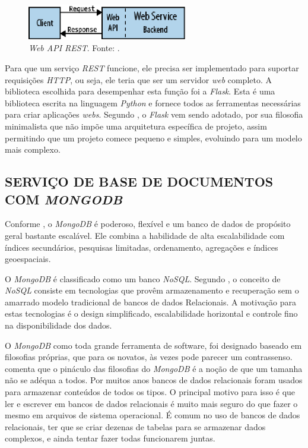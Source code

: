 \begin{figure}[ht]
	\centering
	\includegraphics[width=7cm]{figuras/rest_api.eps}
	\caption{\emph{Web API REST}. Fonte: .}
	\label{rest_api}
\end{figure}


Para que um serviço \emph{REST} funcione, ele precisa ser implementado para suportar requisições \emph{HTTP}, ou seja, ele teria que ser um servidor \emph{web} completo. 
A biblioteca escolhida para desempenhar esta função foi a \emph{Flask}. 
Esta é uma biblioteca escrita na linguagem \emph{Python} e fornece todos as ferramentas necessárias para criar aplicações \emph{webs}. 
Segundo , o \emph{Flask} vem sendo adotado, por sua filosofia minimalista que não impõe uma arquitetura específica de projeto, assim permitindo que um projeto comece pequeno e simples, evoluindo para um modelo mais complexo.


\subsection{SERVIÇO DE BASE DE DOCUMENTOS COM \emph{MONGODB}}
\label{mongodb_sec}

Conforme , o \emph{MongoDB} é poderoso, flexível e um banco de dados de propósito geral bastante escalável. Ele combina a habilidade de alta escalabilidade com índices secundários, pesquisas limitadas, ordenamento, agregações e índices geoespaciais.

O \emph{MongoDB} é classificado como um banco \emph{NoSQL}. Segundo , o conceito de \emph{NoSQL} consiste em tecnologias que provêm armazenamento e recuperação sem o amarrado modelo tradicional de bancos de dados Relacionais. A motivação para estas tecnologias é o design simplificado, escalabilidade horizontal e controle fino na disponibilidade dos dados.

O \emph{MongoDB} como toda grande ferramenta de software, foi designado baseado em filosofias próprias, que para os novatos, às vezes pode parecer um contrassenso. 
 comenta que o pináculo das filosofias do \emph{MongoDB} é a noção de que um tamanha não se adéqua a todos. Por muitos anos bancos de dados relacionais foram usados para armazenar conteúdos de todos os tipos. O principal motivo para isso é que ler e escrever em bancos de dados relacionais é muito mais seguro do que fazer o mesmo em arquivos de sistema operacional.
É comum no uso de bancos de dados relacionais, ter que se criar dezenas de tabelas para se armazenar dados complexos, e ainda tentar fazer todas funcionarem juntas.

